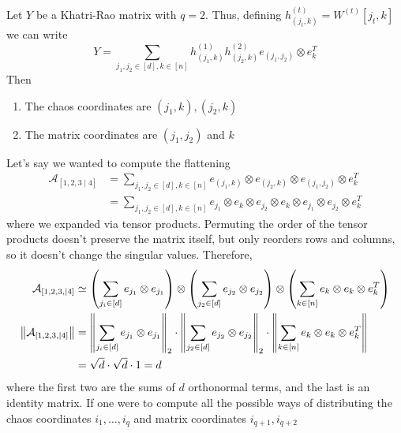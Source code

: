 Let $Y$ be a Khatri-Rao matrix with $q = 2$. 
Thus, defining $h_{(j_t, k)}^{(t)} = W^{(t)}[j_t, k]$ we can write
\[ Y = \sum_{j_1, j_2 \in [d], k \in [n]} h_{(j_1, k)}^{(1)} h_{(j_2, k)}^{(2)} e_{(j_1, j_2)} \otimes e_k^{T}\]
Then
\begin{enumerate}
    \item The chaos coordinates are $(j_1, k), (j_2, k)$
    \item The matrix coordinates are $(j_1, j_2)$ and $k$
\end{enumerate}
Let's say we wanted to compute the flattening
\begin{align*}
    \mathcal{A}_{[1, 2, 3 \mid 4]} &= \sum_{j_1, j_2 \in [d], k \in [n]} e_{(j_1, k)} \otimes e_{(j_2, k)} \otimes e_{(j_1, j_2)} \otimes e_k^T \\
    &= \sum_{j_1, j_2 \in [d], k \in [n]} e_{j_1} \otimes e_k \otimes e_{j_2} \otimes e_k \otimes e_{j_1} \otimes e_{j_2} \otimes e_k^T
\end{align*}
where we expanded via tensor products. Permuting the order of the tensor products doesn't preserve the matrix itself,
but only reorders rows and columns, so it doesn't change the singular values.
Therefore,
\begin{align*}
    \mathcal{A}_{[1, 2, 3, \mid 4]} &\simeq \qty(\sum_{j_i \in [d]} e_{j_1} \otimes e_{j_1}) \otimes \qty(\sum_{j_2 \in [d]} e_{j_2} \otimes e_{j_2}) \otimes \qty(\sum_{k \in [n]} e_k \otimes e_k \otimes e_k^T) \\
    \norm{\mathcal{A}_{[1, 2, 3, \mid 4]}} &= \norm{\sum_{j_i \in [d]} e_{j_1} \otimes e_{j_1}}_2 \cdot \norm{\sum_{j_2 \in [d]} e_{j_2} \otimes e_{j_2}}_2 \cdot \norm{\sum_{k \in [n]} e_k \otimes e_k \otimes e_k^T} \\
    &= \sqrt{d} \cdot \sqrt{d} \cdot 1 = d
\end{align*}
where the first two are the sums of $d$ orthonormal terms, and the last is an identity matrix.
If one were to compute all the possible ways of distributing the chaos coordinates $i_1, \dots, i_q$
and matrix coordinates $i_{q + 1}, i_{q + 2}$

